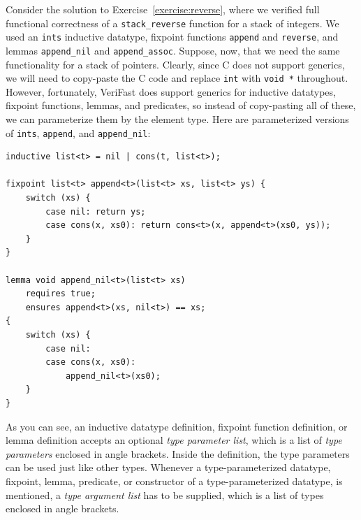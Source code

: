 \documentclass{article}
\begin{document}
Consider the solution to Exercise~\ref{exercise:reverse}, where
we verified full functional correctness of a
\lstinline!stack_reverse! function for a stack of integers. We
used an \lstinline!ints! inductive datatype, fixpoint functions
\lstinline!append! and \lstinline!reverse!, and lemmas
\lstinline!append_nil! and \lstinline!append_assoc!. Suppose,
now, that we need the same functionality for a stack of
pointers. Clearly, since C does not support generics, we will
need to copy-paste the C code and replace \lstinline!int! with
\lstinline!void *! throughout. However, fortunately, VeriFast
does support generics for inductive datatypes, fixpoint
functions, lemmas, and predicates, so instead of copy-pasting
all of these, we can parameterize them by the element type.
Here are parameterized versions of \lstinline!ints!,
\lstinline!append!, and \lstinline!append_nil!:
\begin{lstlisting}
inductive list<t> = nil | cons(t, list<t>);

fixpoint list<t> append<t>(list<t> xs, list<t> ys) {
    switch (xs) {
        case nil: return ys;
        case cons(x, xs0): return cons<t>(x, append<t>(xs0, ys));
    }
}

lemma void append_nil<t>(list<t> xs)
    requires true;
    ensures append<t>(xs, nil<t>) == xs;
{
    switch (xs) {
        case nil:
        case cons(x, xs0):
            append_nil<t>(xs0);
    }
}
\end{lstlisting}
As you can see, an inductive datatype definition, fixpoint
function definition, or lemma definition accepts an optional
\emph{type parameter list}, which is a list of \emph{type
parameters} enclosed in angle brackets. Inside the definition,
the type parameters can be used just like other types. Whenever
a type-parameterized datatype, fixpoint, lemma, predicate, or
constructor of a type-parameterized datatype, is mentioned, a
\emph{type argument list} has to be supplied, which is a list
of types enclosed in angle brackets.
\end{document}

